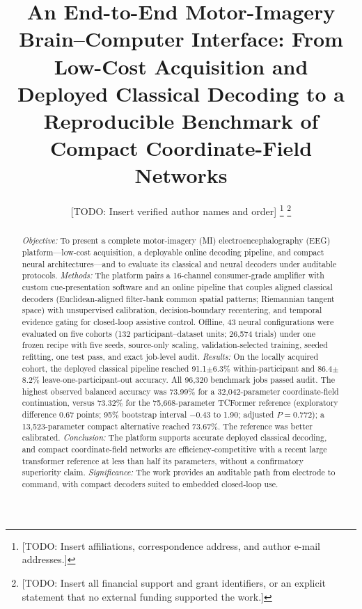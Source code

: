 \documentclass[journal,twoside,web]{template/ieeecolor2-tectonic}
\begin{document}
\title{An End-to-End Motor-Imagery Brain--Computer Interface: From Low-Cost Acquisition and Deployed Classical Decoding to a Reproducible Benchmark of Compact Coordinate-Field Networks}

\author{[TODO: Insert verified author names and order]
\thanks{[TODO: Insert affiliations, correspondence address, and author e-mail addresses.]}
\thanks{[TODO: Insert all financial support and grant identifiers, or an explicit statement that no external funding supported the work.]}}

\maketitle

\begin{abstract}
\textit{Objective:} To present a complete motor-imagery (MI) electroencephalography (EEG) platform---low-cost acquisition, a deployable online decoding pipeline, and compact neural architectures---and to evaluate its classical and neural decoders under auditable protocols.
\textit{Methods:} The platform pairs a 16-channel consumer-grade amplifier with custom cue-presentation software and an online pipeline that couples aligned classical decoders (Euclidean-aligned filter-bank common spatial patterns; Riemannian tangent space) with unsupervised calibration, decision-boundary recentering, and temporal evidence gating for closed-loop assistive control. Offline, 43 neural configurations were evaluated on five cohorts (132 participant--dataset units; 26,574 trials) under one frozen recipe with five seeds, source-only scaling, validation-selected training, seeded refitting, one test pass, and exact job-level audit.
\textit{Results:} On the locally acquired cohort, the deployed classical pipeline reached 91.1$\pm$6.3\% within-participant and 86.4$\pm$8.2\% leave-one-participant-out accuracy. All 96,320 benchmark jobs passed audit. The highest observed balanced accuracy was 73.99\% for a 32,042-parameter coordinate-field continuation, versus 73.32\% for the 75,668-parameter TCFormer reference (exploratory difference 0.67 points; 95\% bootstrap interval $-0.43$ to 1.90; adjusted $P=0.772$); a 13,523-parameter compact alternative reached 73.67\%. The reference was better calibrated.
\textit{Conclusion:} The platform supports accurate deployed classical decoding, and compact coordinate-field networks are efficiency-competitive with a recent large transformer reference at less than half its parameters, without a confirmatory superiority claim.
\textit{Significance:} The work provides an auditable path from electrode to command, with compact decoders suited to embedded closed-loop use.
\end{abstract}
\end{document}
